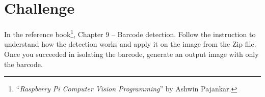 \documentclass{labo}
\begin{document}
\section*{Challenge}
In the reference book\footnote{``\textit{Raspberry Pi Computer Vision Programming}'' by Ashwin Pajankar.}, Chapter 9 – Barcode detection. Follow the instruction to understand how the detection works and apply it on the image from the Zip file. Once you succeeded in isolating the barcode, generate an output image with only the barcode.



\end{document}
